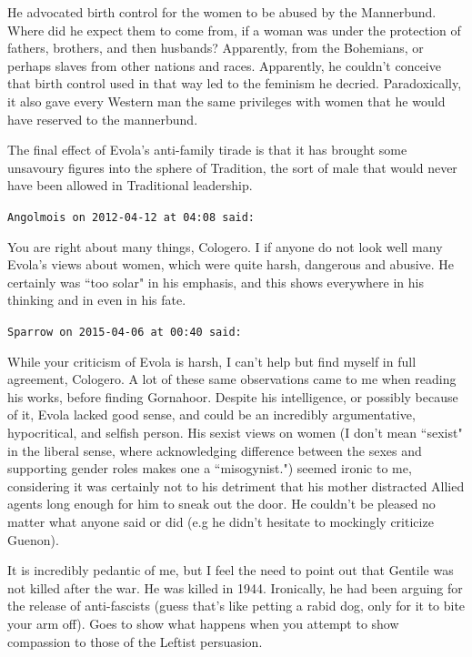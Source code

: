 \begin{footnotesize}
\begin{sffamily}
He advocated birth control for the women to be abused by the Mannerbund. Where did he expect them to come from, if a woman was under the protection of fathers, brothers, and then husbands? Apparently, from the Bohemians, or perhaps slaves from other nations and races. Apparently, he couldn't conceive that birth control used in that way led to the feminism he decried. Paradoxically, it also gave every Western man the same privileges with women that he would have reserved to the mannerbund.

The final effect of Evola's anti-family tirade is that it has brought some unsavoury figures into the sphere of Tradition, the sort of male that would never have been allowed in Traditional leadership.


\hfill

\texttt{Angolmois on 2012-04-12 at 04:08 said: }

You are right about many things, Cologero. I if anyone do not look well many Evola's views about women, which were quite harsh, dangerous and abusive. He certainly was ``too solar" in his emphasis, and this shows everywhere in his thinking and in even in his fate.


\hfill

\texttt{Sparrow on 2015-04-06 at 00:40 said: }

While your criticism of Evola is harsh, I can't help but find myself in full agreement, Cologero. A lot of these same observations came to me when reading his works, before finding Gornahoor. Despite his intelligence, or possibly because of it, Evola lacked good sense, and could be an incredibly argumentative, hypocritical, and selfish person. His sexist views on women (I don't mean ``sexist" in the liberal sense, where acknowledging difference between the sexes and supporting gender roles makes one a ``misogynist.") seemed ironic to me, considering it was certainly not to his detriment that his mother distracted Allied agents long enough for him to sneak out the door. He couldn't be pleased no matter what anyone said or did (e.g he didn't hesitate to mockingly criticize Guenon).

It is incredibly pedantic of me, but I feel the need to point out that Gentile was not killed after the war. He was killed in 1944. Ironically, he had been arguing for the release of anti-fascists (guess that's like petting a rabid dog, only for it to bite your arm off). Goes to show what happens when you attempt to show compassion to those of the Leftist persuasion.


\end{sffamily}\end{footnotesize}
